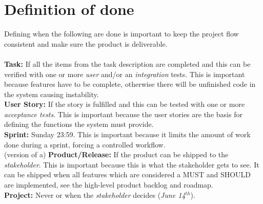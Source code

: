 \documentclass[10pt,a4paper]{report}
\begin{document}
	\section{Definition of done}
		Defining when the following are done is important to keep the project flow consistent and make sure the product is deliverable. \\
		\\
		\textbf{Task:} If all the items from the task description are completed and this can be verified with one or more \emph{user} and/or an \emph{integration} tests. This is important because features have to be complete, otherwise there will be unfinished code in the system causing instability.\\
		\newline
		\textbf{User Story:} If the story is fulfilled and this can be tested with one or more \emph{acceptance tests}. This is important because the user stories are the basis for defining the functions the system must provide.\\
		\newline
		\textbf{Sprint:} Sunday 23:59. This is important because it limits the amount of work done during a sprint, forcing a controlled workflow.\\
		\newline
		(version of a) \textbf{Product/Release:} If the product can be shipped to the \emph{stakeholder}. This is important because this is what the stakeholder gets to see. It can be shipped when all features which are considered a MUST and SHOULD are implemented, see the high-level product backlog and roadmap. \\
		\newline
		\textbf{Project:} Never or when the \emph{stakeholder} decides (\emph{June 14$^{th}$}).
\end{document}
